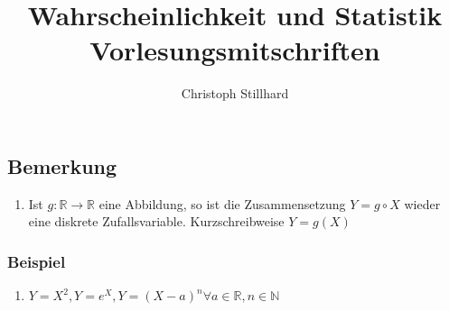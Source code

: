 \documentclass[10pt]{article}
\title{\textbf{Wahrscheinlichkeit und Statistik Vorlesungsmitschriften}}
\author{Christoph Stillhard}
\date{}
\newcommand{\enumstart}{\begin{enumerate}}
\newcommand{\enumend}{\end{enumerate}}
\newcommand{\N}{\mathbb{N}}
\newcommand{\R}{\mathbb{R}}
\begin{document}
\maketitle
{}
\thispagestyle{empty}

\let\stdsection\section
\renewcommand\section{\newpage\stdsection}

\newpage
{}
\setcounter{page}{1}
\tableofcontents

\newpage
{}
\setcounter{page}{1}







\subsection{Bemerkung}
\enumstart
	\item Ist $g: \R \rightarrow \R$ eine Abbildung, so ist die Zusammensetzung $Y = g \circ X$ wieder eine diskrete Zufallsvariable. Kurzschreibweise $Y = g(X)$
\enumend

\subsubsection{Beispiel}
\enumstart
	\item $Y = X^2, Y = e^X, Y = (X-a)^n \forall a \in \R, n \in \N$
\enumend
\end{document}
